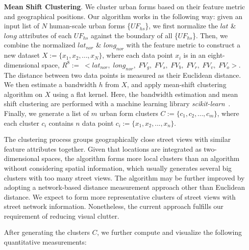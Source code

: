 \vspace*{2mm}
\noindent
\textbf{Mean Shift Clustering}.
We cluster urban forms based on their feature metric and geographical positions.
Our algorithm works in the following way: 
given an input list of $N$ human-scale urban forms \{$UF_{hs}$\}, we first normalize the $lat$ \& $long$ attributes of each $UF_{hs}$ against the boundary of all \{$UF_{hs}$\}.
Then, we combine the normalized $lat_{nor}$ \& $long_{nor}$ with the feature metric to construct a new dataset $X := \{x_1, x_2, ..., x_N\}$, where each data point $x_i$ is in an eight-dimensional space, $R^{8} := \; <lat_{nor}, \; long_{nor}, \; FV_g, \; FV_s, \; FV_b, \; FV_r, \; FV_v, \; FV_o>$.
The distance between two data points is measured as their Euclidean distance.
We then estimate a bandwidth $h$ from $X$, and apply mean-shift clustering algorithm on $X$ using a flat kernel.
Here, the bandwidth estimation and mean shift clustering are performed with a machine learning library \textit{scikit-learn}~\cite{scikit-learn}.
Finally, we generate a list of $m$ urban form clusters $C := \{c_1, c_2, ..., c_m\}$, where each cluster $c_i$ contains $n$ data point $c_i := \{x_1, x_2, ..., x_n\}$.

The clustering process groups geographically close street views with similar feature attributes together.
Given that locations are integrated as two-dimensional spaces, the algorithm forms more local clusters than an algorithm without considering spatial information, which usually generates several big clusters with too many street views.
The algorithm may be further improved by adopting a network-based distance measurement approach other than Euclidean distance.
We expect to form more representative clusters of street views with street network information.
Nonetheless, the current approach fulfills our requirement of reducing visual clutter.

\vspace*{2mm}
After generating the clusters $C$, we further compute and visualize the following quantitative measurements:

